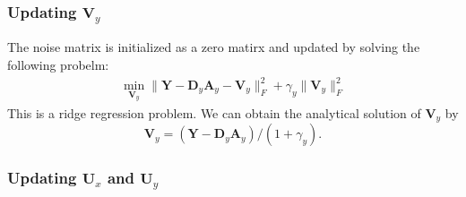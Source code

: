 \documentclass[10pt,twocolumn,letterpaper]{article}
\begin{document}
\subsubsection{Updating $\mathbf{V}_{y}$}
The noise matrix is initialized as a zero matirx and updated by solving the following probelm:
\begin{equation}
\begin{split}
\min_{\mathbf{V}_{y}}
\|\mathbf{Y}-\mathbf{D}_{y}\mathbf{A}_{y}-\mathbf{V}_{y}\|_{F}^{2}
+
\gamma_{y}\|\mathbf{V}_{y}\|_{F}^{2}
\end{split}
\end{equation}
This is a ridge regression problem. We can obtain the analytical solution of $\mathbf{V}_{y}$ by 
\begin{equation}
\mathbf{V}_{y} = (\mathbf{Y}-\mathbf{D}_{y}\mathbf{A}_{y})/(1+\gamma_{y}).
\end{equation}



\subsubsection{Updating $\mathbf{U}_{x}$ and $\mathbf{U}_{y}$}
\end{document}

